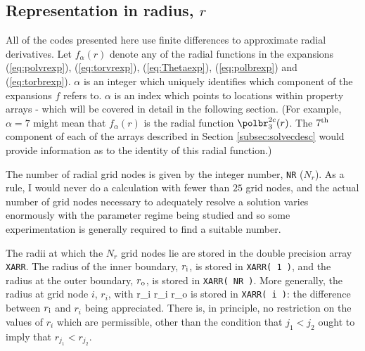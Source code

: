 \subsection{Representation in radius, $r$}
\label{subsec:radrep}

All of the codes presented here use finite differences
to approximate radial derivatives. Let $f_{\alpha}(r)$ denote
any of the radial functions in the expansions
(\ref{eq:polvrexp}),
(\ref{eq:torvrexp}), (\ref{eq:Thetaexp}),
(\ref{eq:polbrexp}) and (\ref{eq:torbrexp}).
$\alpha$ is an integer which uniquely identifies which
component of the expansions $f$ refers to.
$\alpha$ is an index which points to locations within
property arrays - which will be covered in detail
in the following section.
(For example, $\alpha = 7$ might mean that
$f_{\alpha}(r)$ is the radial function
$\polbr_{3}^{2c}(r)$. The $7^{\rm th}$ component of each
of the arrays described in Section \ref{subsec:solvecdesc}
would provide information as to the identity of this
radial function.)

The number of radial grid nodes is given by the 
integer number, \verb+NR+ ($N_r$). As a rule, I would
never do a calculation with fewer than $25$ grid nodes,
and the actual number of grid nodes necessary to adequately
resolve a solution varies enormously with the parameter
regime being studied and so some experimentation is
generally required to find a suitable number.

The radii at which the $N_r$ grid nodes lie are
stored in the double precision array \verb+XARR+.
The radius of the inner boundary, $r_{\rm i}$,
is stored in \verb.XARR( 1 )., and the radius
at the outer boundary, $r_{\rm o}$, is stored in
\verb.XARR( NR ).. More generally, the radius
at grid node $i$, $r_i$, with
\beq
r_{\rm i} \leq
r_i \leq
r_{\rm o}
\label{eq:radialnodes}
\eeq
is stored in \verb-XARR( i )-: the difference
between $r_{\rm i}$ and $r_i$ being appreciated.
There is, in principle, no restriction on the
values of $r_i$ which are permissible, other
than the condition that
$j_1 < j_2$ ought to imply that $r_{j_1} < r_{j_2}$.

